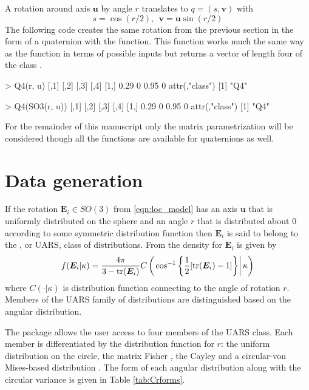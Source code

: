 A rotation around axis $\bm u$ by angle $r$ translates to $q=(s,\bm v)$ with
\[
s = \cos{(r/2)},  \ \ \bm v = \bm u \sin {(r/2)}
\]
The following code creates the same rotation from the previous section in the form of a quaternion with the  function.  This function works much the same way as the  function in terms of possible inputs but returns a vector of length four of the class . 

\begin{example}
> Q4(r, u)
     [,1] [,2] [,3]  [,4]
[1,] 0.29    0 0.95     0
attr(,"class")
[1] "Q4"

> Q4(SO3(r, u))
     [,1] [,2] [,3]  [,4]
[1,] 0.29    0 0.95     0
attr(,"class")
[1] "Q4"
\end{example}


For the remainder of this manuscript only the matrix parametrization will be considered though all the functions are available for quaternions as well.

\section{Data generation\label{section:generation}} 

If the rotation $\bm{E}_i\in SO(3)$ from \eqref{eqn:loc_model} has an axis $\bm u$ that is uniformly distributed on the sphere and an angle $r$ that is distributed about $0$ according to some symmetric distribution function then $\bm E_i$ is said to belong to the , or UARS, class of distributions.   From \cite{bingham2009} the density for $\bm E_i$ is given by
\begin{equation}\label{eq:uarsden}
f(\bm E_i|\kappa)=\frac{4\pi}{3-\text{tr}(\bm E_i)}C\left(\left.\cos^{-1}\left\{\frac{1}{2}[\text{tr}(\bm E_i)-1]\right\}\right|\kappa\right)
\end{equation}
where $C(\cdot|\kappa)$ is distribution function connecting to the angle of rotation $r$.  Members of the UARS family of distributions are distinguished based on the angular distribution.


The  package allows the user access to four members of the UARS class.  Each member is differentiated by the distribution function for $r$: the uniform distribution on the circle, the matrix Fisher \citep{langevin2005, downs1972, khatri1977, jupp1979}, the Cayley  \citep{Schaeben1997, leon2006} and a circular-von Mises-based distribution \citep{bingham2009}.   The form of each angular distribution along with the circular variance is given in Table \ref{tab:Crforms}.

